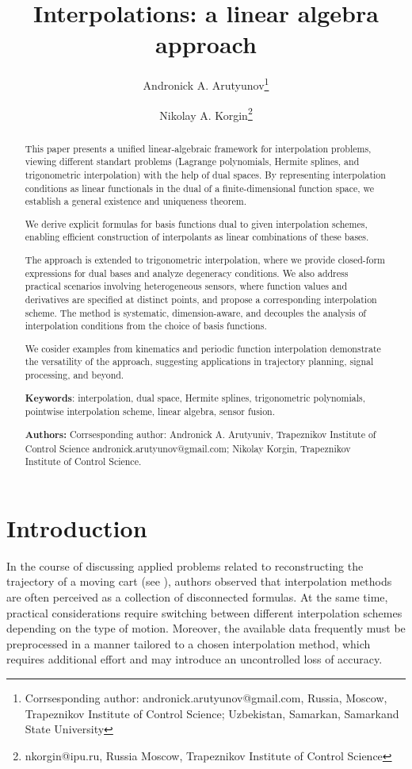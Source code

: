 \documentclass{article}
\title{Interpolations: a linear algebra approach}
\author{Andronick A. Arutyunov\footnote{Corrsesponding author: andronick.arutyunov@gmail.com, Russia, Moscow, Trapeznikov Institute of Control Science; Uzbekistan, Samarkan, Samarkand State University} \and Nikolay A. Korgin\footnote{nkorgin@ipu.ru, Russia Moscow, Trapeznikov Institute of Control Science}}
\date{}
\theoremstyle{definition}
\theoremstyle{definition}
\numberwithin{figure}{section}
\newcommand{\1}{\mathbf{1}}
\begin{document}
\maketitle

\begin{abstract}
	This paper presents a unified linear-algebraic framework for interpolation problems, viewing different standart problems (Lagrange polynomials, Hermite splines, and trigonometric interpolation) with the help of dual spaces. By representing interpolation conditions as linear functionals in the dual of a finite-dimensional function space, we establish a general existence and uniqueness theorem.
	
	We derive explicit formulas for basis functions dual to given interpolation schemes, enabling efficient construction of interpolants as linear combinations of these bases. 
	
	The approach is extended to trigonometric interpolation, where we provide closed-form expressions for dual bases and analyze degeneracy conditions. We also address practical scenarios involving heterogeneous sensors, where function values and derivatives are specified at distinct points, and propose a corresponding interpolation scheme. The method is systematic, dimension-aware, and decouples the analysis of interpolation conditions from the choice of basis functions. 
	
	We cosider examples from kinematics and periodic function interpolation demonstrate the versatility of the approach, suggesting applications in trajectory planning, signal processing, and beyond.
	
	\textbf{Keywords}: interpolation, dual space, Hermite splines, trigonometric polynomials, pointwise interpolation scheme, linear algebra, sensor fusion.
	
	\textbf{Authors:} Corrsesponding author: Andronick A. Arutyuniv, Trapeznikov Institute of Control Science  andronick.arutyunov@gmail.com; 
							 Nikolay Korgin, Trapeznikov Institute of Control Science.
\end{abstract}

\section{Introduction}

In the course of discussing applied problems related to reconstructing the trajectory of a moving cart (see \cite{2024-ot,MakarovMorozov2025}), authors observed that interpolation methods are often perceived as a collection of disconnected formulas. At the same time, practical considerations require switching between different interpolation schemes depending on the type of motion. Moreover, the available data frequently must be preprocessed in a manner tailored to a chosen interpolation method, which requires additional effort and may introduce an uncontrolled loss of accuracy.
\end{document}
